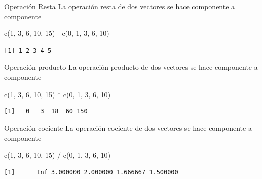 \documentclass[
  ignorenonframetext,
  aspectratio=169,
  spanish,
]{beamer}
\newenvironment{Shaded}{\begin{snugshade}}{\end{snugshade}}
\newcommand{\DecValTok}[1]{\textcolor[rgb]{0.68,0.00,0.00}{#1}}
\newcommand{\FunctionTok}[1]{\textcolor[rgb]{0.28,0.35,0.67}{#1}}
\newcommand{\NormalTok}[1]{\textcolor[rgb]{0.00,0.23,0.31}{#1}}
\newcommand{\SpecialCharTok}[1]{\textcolor[rgb]{0.37,0.37,0.37}{#1}}
\begin{document}
\begin{frame}[fragile]{Operación Resta}
\label{operaciuxf3n-resta}
La operación resta de dos vectores se hace componente a componente

\begin{Shaded}
\begin{Highlighting}[]
\FunctionTok{c}\NormalTok{(}\DecValTok{1}\NormalTok{, }\DecValTok{3}\NormalTok{, }\DecValTok{6}\NormalTok{, }\DecValTok{10}\NormalTok{, }\DecValTok{15}\NormalTok{) }\SpecialCharTok{{-}} \FunctionTok{c}\NormalTok{(}\DecValTok{0}\NormalTok{, }\DecValTok{1}\NormalTok{, }\DecValTok{3}\NormalTok{, }\DecValTok{6}\NormalTok{, }\DecValTok{10}\NormalTok{) }
\end{Highlighting}
\end{Shaded}

\begin{verbatim}
[1] 1 2 3 4 5
\end{verbatim}
\end{frame}

\begin{frame}[fragile]{Operación producto}
\label{operaciuxf3n-producto}
La operación producto de dos vectores se hace componente a componente

\begin{Shaded}
\begin{Highlighting}[]
\FunctionTok{c}\NormalTok{(}\DecValTok{1}\NormalTok{, }\DecValTok{3}\NormalTok{, }\DecValTok{6}\NormalTok{, }\DecValTok{10}\NormalTok{, }\DecValTok{15}\NormalTok{) }\SpecialCharTok{*} \FunctionTok{c}\NormalTok{(}\DecValTok{0}\NormalTok{, }\DecValTok{1}\NormalTok{, }\DecValTok{3}\NormalTok{, }\DecValTok{6}\NormalTok{, }\DecValTok{10}\NormalTok{) }
\end{Highlighting}
\end{Shaded}

\begin{verbatim}
[1]   0   3  18  60 150
\end{verbatim}
\end{frame}

\begin{frame}[fragile]{Operación cociente}
\label{operaciuxf3n-cociente}
La operación cociente de dos vectores se hace componente a componente

\begin{Shaded}
\begin{Highlighting}[]
\FunctionTok{c}\NormalTok{(}\DecValTok{1}\NormalTok{, }\DecValTok{3}\NormalTok{, }\DecValTok{6}\NormalTok{, }\DecValTok{10}\NormalTok{, }\DecValTok{15}\NormalTok{) }\SpecialCharTok{/} \FunctionTok{c}\NormalTok{(}\DecValTok{0}\NormalTok{, }\DecValTok{1}\NormalTok{, }\DecValTok{3}\NormalTok{, }\DecValTok{6}\NormalTok{, }\DecValTok{10}\NormalTok{) }
\end{Highlighting}
\end{Shaded}

\begin{verbatim}
[1]      Inf 3.000000 2.000000 1.666667 1.500000
\end{verbatim}
\end{frame}
\end{document}
